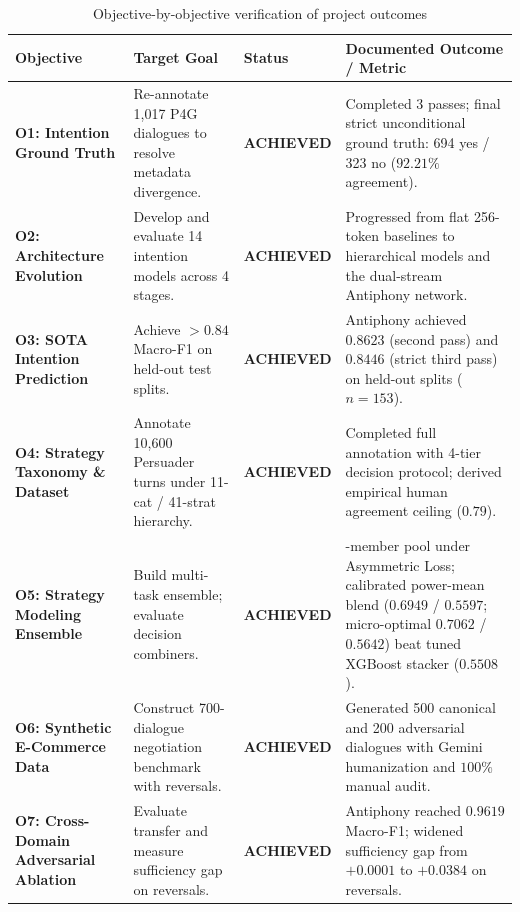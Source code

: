 \begin{table}[htbp]
  \centering
  \small
  \caption{Objective-by-objective verification of project outcomes}
  \label{tab:objective-verification}
  \begin{tabularx}{\textwidth}{>{\raggedright\arraybackslash\bfseries}p{} >{\raggedright\arraybackslash}p{} >{\centering\arraybackslash}p{} >{\raggedright\arraybackslash}X}
    \toprule
    \textbf{Objective} & \textbf{Target Goal} & \textbf{Status} & \textbf{Documented Outcome / Metric} \\
    \midrule
    O1: Intention Ground Truth & Re-annotate 1,017 P4G dialogues to resolve metadata divergence. & \textbf{ACHIEVED} & Completed 3 passes; final strict unconditional ground truth: 694 yes / 323 no ($92.21\%$ agreement). \\
    \midrule
    \rowcolor{lightbg}
    O2: Architecture Evolution & Develop and evaluate 14 intention models across 4 stages. & \textbf{ACHIEVED} & Progressed from flat 256-token baselines to hierarchical models and the dual-stream Antiphony network. \\
    \midrule
    O3: SOTA Intention Prediction & Achieve $>0.84$ Macro-F1 on held-out test splits. & \textbf{ACHIEVED} & Antiphony achieved $0.8623$ (second pass) and $0.8446$ (strict third pass) on held-out splits ($n=153$). \\
    \midrule
    \rowcolor{lightbg}
    O4: Strategy Taxonomy \& Dataset & Annotate 10,600 Persuader turns under 11-cat / 41-strat hierarchy. & \textbf{ACHIEVED} & Completed full annotation with 4-tier decision protocol; derived empirical human agreement ceiling ($0.79$). \\
    \midrule
    O5: Strategy Modeling Ensemble & Build multi-task ensemble; evaluate decision combiners. & \textbf{ACHIEVED} & 19-member pool under Asymmetric Loss; calibrated power-mean blend ($0.6949$ / $0.5597$; micro-optimal $0.7062$ / $0.5642$) beat tuned XGBoost stacker ($0.5508$). \\
    \midrule
    \rowcolor{lightbg}
    O6: Synthetic E-Commerce Data & Construct 700-dialogue negotiation benchmark with reversals. & \textbf{ACHIEVED} & Generated 500 canonical and 200 adversarial dialogues with Gemini humanization and $100\%$ manual audit. \\
    \midrule
    O7: Cross-Domain Adversarial Ablation & Evaluate transfer and measure sufficiency gap on reversals. & \textbf{ACHIEVED} & Antiphony reached $0.9619$ Macro-F1; widened sufficiency gap from $+0.0001$ to $+0.0384$ on reversals. \\
    \bottomrule
  \end{tabularx}
\end{table}

